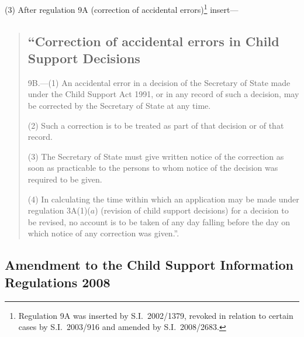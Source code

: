 \documentclass[12pt,a4paper]{article}
\begin{document}
(3) After regulation 9A (correction of accidental errors)\footnote{Regulation 9A was inserted by S.I.~2002/1379, revoked in relation to certain cases by S.I.~2003/916 and amended by S.I.~2008/2683.} insert—
 \begin{quotation}
\subsection*{“Correction of accidental errors in Child Support Decisions}

9B.—(1) An accidental error in a decision of the Secretary of State made under the Child Support Act 1991, or in any record of such a decision, may be corrected by the Secretary of State at any time.

(2) Such a correction is to be treated as part of that decision or of that record.

(3) The Secretary of State must give written notice of the correction as soon as practicable to the persons to whom notice of the decision was required to be given.

(4) In calculating the time within which an application may be made under regulation 3A(1)($a$)  (revision of child support decisions) for a decision to be revised, no account is to be taken of any day falling before the day on which notice of any correction was given.”.
\end{quotation}

\subsection[7. Amendment to the Child Support Information Regulations 2008]{Amendment to the Child Support Information Regulations 2008}
\end{document}
